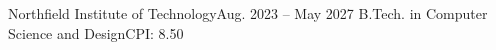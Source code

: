 \resumeSubheading
  {Northfield Institute of Technology}{Aug. 2023 -- May 2027}
  {B.Tech. in Computer Science and Design}{CPI: 8.50}
